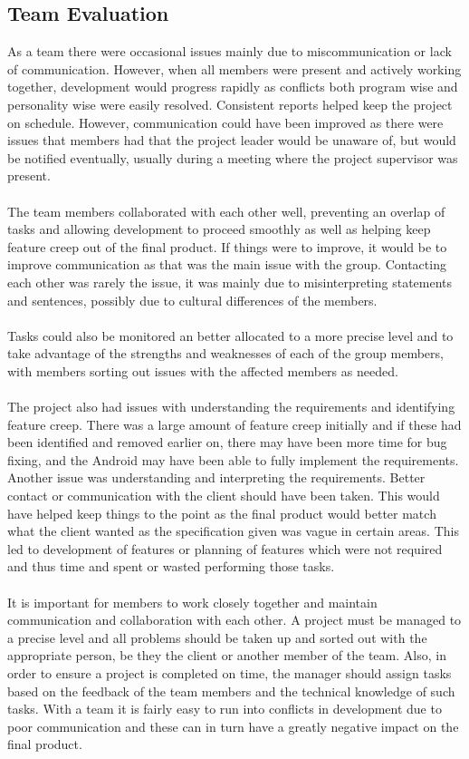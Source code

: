 \documentclass[12pt]{article}
\begin{document}
\subsection{Team Evaluation}
As a team there were occasional issues mainly due to miscommunication or lack of communication. However, when all members were present and actively working together, development would progress rapidly as conflicts both program wise and personality wise were easily resolved. Consistent reports helped keep the project on schedule. However, communication could have been improved as there were issues that members had that the project leader would be unaware of, but would be notified eventually, usually during a meeting where the project supervisor was present. 
~\\\\
The team members collaborated with each other well, preventing an overlap of tasks and allowing development to proceed smoothly as well as helping keep feature creep out of the final product. If things were to improve, it would be to improve communication as that was the main issue with the group. Contacting each other was rarely the issue, it was mainly due to misinterpreting statements and sentences, possibly due to cultural differences of the members.
~\\\\
Tasks could also be monitored an better allocated to a more precise level and to take advantage of the strengths and weaknesses of each of the group members, with members sorting out issues with the affected members as needed.
~\\\\
The project also had issues with understanding the requirements and identifying feature creep. There was a large amount of feature creep initially and if these had been identified and removed earlier on, there may have been more time for bug fixing, and the Android may have been able to fully implement the requirements. Another issue was understanding and interpreting the requirements. Better contact or communication with the client should have been taken. This would have helped keep things to the point as the final product would better match what the client wanted as the specification given was vague in certain areas. This led to development of features or planning of features which were not required and thus time and spent or wasted performing those tasks.
~\\\\
It is important for members to work closely together and maintain communication and collaboration with each other. A project must be managed to a precise level and all problems should be taken up and sorted out with the appropriate person, be they the client or another member of the team. Also, in order to ensure a project is completed on time, the manager should assign tasks based on the feedback of the team members and the technical knowledge of such tasks. With a team it is fairly easy to run into conflicts in development due to poor communication and these can in turn have a greatly negative impact on the final product.
\newpage
\end{document}
